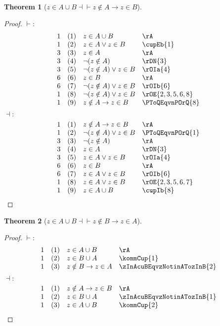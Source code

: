 \documentclass{book}
\theoremstyle{plain}
\newtheorem{theorem}{Theorem}
\theoremstyle{remark}
\theoremstyle{definition}
\begin{document}
\label{zInAcuBEqvzNotinATozInB}
\begin{theorem}[\(z\in A \cup B \dashv\vdash z\notin A \rightarrow z\in B\)]
\end{theorem}
\begin{proof}
    \(\vdash:\)
	\[
	\begin{array}{llll}
		1 & (1) & z \in A \cup B & \rA \\
		1 & (2) & z\in A\lor z\in B & \cupEb{1} \\
		3 & (3) & z\in A & \rA \\
		3 & (4) & \neg(z\notin A) & \rDN{3}\\
		3 & (5) & \neg(z\notin A)\lor z\in B & \rOIa{4}\\
		6 & (6) & z\in B & \rA\\
		6 & (7) & \neg(z\notin A)\lor z\in B & \rOIb{6}\\
		1 & (8) & \neg(z\notin A)\lor z\in B & \rOE{2,3,5,6,8}\\
		1 & (9) & z\notin A\rightarrow z\in B & \PToQEqvnPOrQ{8}\\
	\end{array}
	\]	
	\(\dashv:\)
	\[
	\begin{array}{llll}
		1 & (1) & z\notin A\rightarrow z\in B & \rA \\
		1 & (2) & \neg(z\notin A)\lor z\in B & \PToQEqvnPOrQ{1} \\
		3 & (3) & \neg(z\notin A) & \rA \\
		3 & (4) & z\in A & \rDN{3} \\
		3 & (5) & z\in A\lor z\in B & \rOIa{4} \\
		6 & (6) & z\in B & \rA \\
		6 & (7) & z\in A\lor z\in B & \rOIb{6} \\
		1 & (8) & z\in A\lor z\in B & \rOE{2,3,5,6,7} \\
		1 & (9) & z\in A\cup B & \cupIb{8} \\
	\end{array}
	\]	
\end{proof}

\label{zInAcuBEqvzNotinBTozInA}
\begin{theorem}[\(z\in A \cup B \dashv\vdash z\notin B \rightarrow z\in A\)]
\end{theorem}
\begin{proof}
		\(\vdash:\)
		\[
		\begin{array}{llll}
			1 & (1) & z \in A \cup B & \rA \\
			1 & (2) & z\in B\cup A & \kommCup{1}  \\
			1 & (3) & z\notin B\rightarrow z\in A & \zInAcuBEqvzNotinATozInB{2}  \\
		\end{array}
		\]	
		\(\dashv:\)
		\[
		\begin{array}{llll}
			1 & (1) & z\notin A\rightarrow z\in B & \rA \\
			1 & (2) & z\in B\cup A & \zInAcuBEqvzNotinATozInB{1} \\
			1 & (3) & z\in A\cup B & \kommCup{2} \\
		\end{array}
		\]		
\end{proof}
\end{document}
